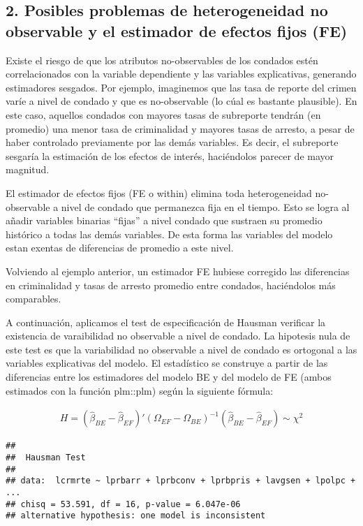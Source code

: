 \documentclass[
]{article}
\begin{document}
\hypertarget{posibles-problemas-de-heterogeneidad-no-observable-y-el-estimador-de-efectos-fijos-fe}{%
\subsection{2. Posibles problemas de heterogeneidad no observable y el
estimador de efectos fijos
(FE)}\label{posibles-problemas-de-heterogeneidad-no-observable-y-el-estimador-de-efectos-fijos-fe}}

Existe el riesgo de que los atributos no-observables de los condados
estén correlacionados con la variable dependiente y las variables
explicativas, generando estimadores sesgados. Por ejemplo, imaginemos
que las tasa de reporte del crimen varíe a nivel de condado y que es
no-observable (lo cúal es bastante plausible). En este caso, aquellos
condados con mayores tasas de subreporte tendrán (en promedio) una menor
tasa de criminalidad y mayores tasas de arresto, a pesar de haber
controlado previamente por las demás variables. Es decir, el subreporte
sesgaría la estimación de los efectos de interés, haciéndolos parecer de
mayor magnitud.

El estimador de efectos fijos (FE o within) elimina toda heterogeneidad
no-observable a nivel de condado que permanezca fija en el tiempo. Esto
se logra al añadir variables binarias ``fijas'' a nivel condado que
sustraen su promedio histórico a todas las demás variables. De esta
forma las variables del modelo estan exentas de diferencias de promedio
a este nivel.

Volviendo al ejemplo anterior, un estimador FE hubiese corregido las
diferencias en criminalidad y tasas de arresto promedio entre condados,
haciéndolos más comparables.

A continuación, aplicamos el test de especificación de Hausman verificar
la existencia de varaibilidad no observable a nivel de condado. La
hipotesis nula de este test es que la variabilidad no observable a nivel
de condado es ortogonal a las variables explicativas del modelo. El
estadístico se construye a partir de las diferencias entre los
estimadores del modelo BE y del modelo de FE (ambos estimados con la
función plm::plm) según la siguiente fórmula:

\begin{gather*}
H = ( \hat \beta_{BE} - \hat \beta_{EF})' (\Omega_{EF}-\Omega_{BE})^{-1}  ( \hat \beta_{BE} - \hat \beta_{EF}) \sim \chi^2
\end{gather*}

\begin{verbatim}
## 
##  Hausman Test
## 
## data:  lcrmrte ~ lprbarr + lprbconv + lprbpris + lavgsen + lpolpc +  ...
## chisq = 53.591, df = 16, p-value = 6.047e-06
## alternative hypothesis: one model is inconsistent
\end{verbatim}
\end{document}
